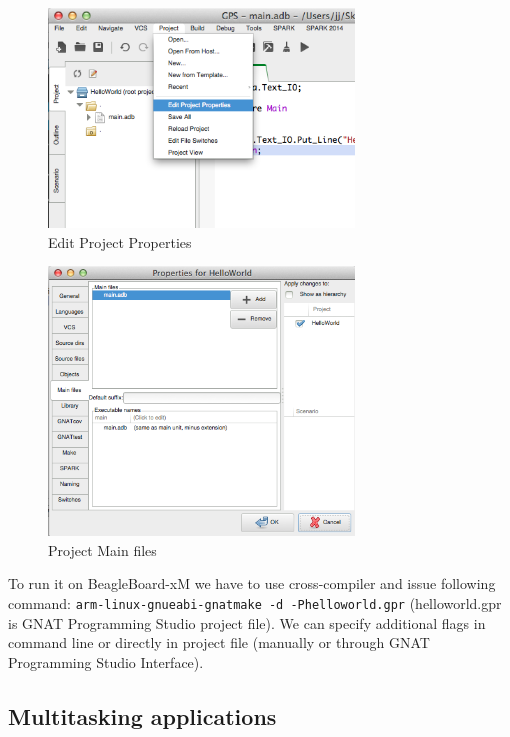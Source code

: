 \begin{figure}[ht]%
    \begin{center}
    	\includegraphics[width=3.2in]{figures/EditProjectProperties.png}
    	\caption{Edit Project Properties}
    \end{center}
    \label{figure:editprojectproperties}
\end{figure}

\begin{figure}[ht]%
    \begin{center}
    	\includegraphics[width=3.2in]{figures/Properties-MainFiles.png}
    	\caption{Project Main files}
    \end{center}
    \label{figure:mainfiles}
\end{figure}

To run it on BeagleBoard-xM we have to use cross-compiler and issue following command: \lstinline{arm-linux-gnueabi-gnatmake -d -Phelloworld.gpr} (helloworld.gpr is GNAT Programming Studio project file). We can specify additional flags in command line or directly in project file (manually or through GNAT Programming Studio Interface).


\subsection{Multitasking applications}
\label{pcapumpimpl:beagleboard:multitasking}

